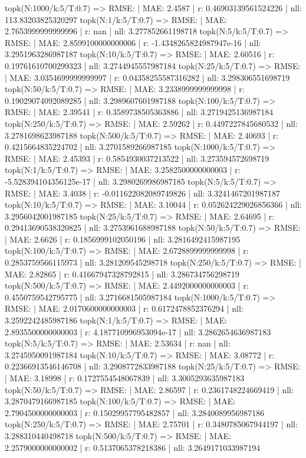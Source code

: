 topk(N:1000/k:5/T:0.7) => RMSE: | MAE: 2.4587 | r: 0.46903139561524226 | nll: 113.83203825320297
topk(N:1/k:5/T:0.7) => RMSE: | MAE: 2.7653999999999996 | r: nan | nll: 3.277852661198718
topk(N:5/k:5/T:0.7) => RMSE: | MAE: 2.8599100000000006 | r: -1.4348265824987947e-16 | nll: 3.2951963286987187
topk(N:10/k:5/T:0.7) => RMSE: | MAE: 2.60516 | r: 0.19761610700299323 | nll: 3.2744945557987184
topk(N:25/k:5/T:0.7) => RMSE: | MAE: 3.0354699999999997 | r: 0.04358255587316282 | nll: 3.298306551698719
topk(N:50/k:5/T:0.7) => RMSE: | MAE: 3.2338999999999998 | r: 0.19029074092089285 | nll: 3.2989607601987188
topk(N:100/k:5/T:0.7) => RMSE: | MAE: 2.39541 | r: 0.3589738505363886 | nll: 3.2719425136987184
topk(N:250/k:5/T:0.7) => RMSE: | MAE: 2.59262 | r: 0.4497227845680532 | nll: 3.2781698623987188
topk(N:500/k:5/T:0.7) => RMSE: | MAE: 2.40693 | r: 0.4215664835224702 | nll: 3.2701589266987185
topk(N:1000/k:5/T:0.7) => RMSE: | MAE: 2.45393 | r: 0.5854930037213522 | nll: 3.273594572698719
topk(N:1/k:5/T:0.7) => RMSE: | MAE: 3.2582500000000003 | r: -5.528394104356125e-17 | nll: 3.2980269986987185
topk(N:5/k:5/T:0.7) => RMSE: | MAE: 3.4038 | r: -0.011622082089749826 | nll: 3.3241467201987187
topk(N:10/k:5/T:0.7) => RMSE: | MAE: 3.10044 | r: 0.052624229026856366 | nll: 3.2956042001987185
topk(N:25/k:5/T:0.7) => RMSE: | MAE: 2.64695 | r: 0.29413690538320825 | nll: 3.2753961688987188
topk(N:50/k:5/T:0.7) => RMSE: | MAE: 2.6626 | r: 0.1856999102050196 | nll: 3.2816492415987195
topk(N:100/k:5/T:0.7) => RMSE: | MAE: 2.6728899999999998 | r: 0.2853759566115973 | nll: 3.281209545298718
topk(N:250/k:5/T:0.7) => RMSE: | MAE: 2.82865 | r: 0.41667947328792815 | nll: 3.286734756298719
topk(N:500/k:5/T:0.7) => RMSE: | MAE: 2.4492000000000003 | r: 0.4550759542795775 | nll: 3.2716681505987184
topk(N:1000/k:5/T:0.7) => RMSE: | MAE: 2.0170600000000003 | r: 0.6172478852376294 | nll: 3.2592242485987186
topk(N:1/k:5/T:0.7) => RMSE: | MAE: 2.8935500000000003 | r: 4.187710996953094e-17 | nll: 3.2862654636987183
topk(N:5/k:5/T:0.7) => RMSE: | MAE: 2.53634 | r: nan | nll: 3.2745950091987184
topk(N:10/k:5/T:0.7) => RMSE: | MAE: 3.08772 | r: 0.22366913546146708 | nll: 3.2908772833987188
topk(N:25/k:5/T:0.7) => RMSE: | MAE: 3.18998 | r: 0.1727554548067839 | nll: 3.3005293635987183
topk(N:50/k:5/T:0.7) => RMSE: | MAE: 2.86597 | r: 0.2361748224669419 | nll: 3.2870479166987185
topk(N:100/k:5/T:0.7) => RMSE: | MAE: 2.7904500000000003 | r: 0.15029957795482857 | nll: 3.2840089956987186
topk(N:250/k:5/T:0.7) => RMSE: | MAE: 2.75701 | r: 0.3480785067944197 | nll: 3.288310440498718
topk(N:500/k:5/T:0.7) => RMSE: | MAE: 2.2579000000000002 | r: 0.5137065378218386 | nll: 3.2649171033987194
